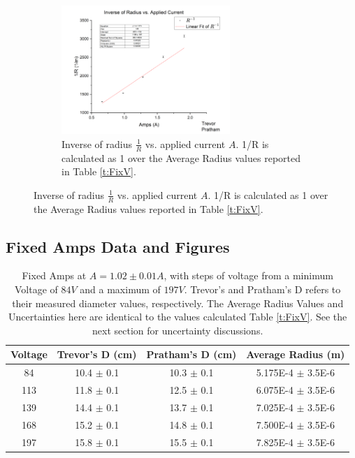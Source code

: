 \documentclass[12pt]{article}
\begin{document}
\begin{figure} [h]
    \begin{subfigure}
        \centering
        \includegraphics[width=0.7\textwidth]{figures/EOM_Fix_Voltage.png}
        \caption{Inverse of radius $\frac{1}{R}$ vs. applied current $A$. 1/R is calculated as 1 over the Average Radius values reported in Table \ref{t:FixV}.}
        \label{f:FixV}
    \end{subfigure}
\end{figure}

\clearpage

\subsection{Fixed Amps Data and Figures}

\begin{table}[h]
    \centering
    \begin{tabular}{|c|c|c|c|}
        \hline
        Voltage & Trevor's D (cm) & Pratham's D (cm) & Average Radius (m) \\ 
        \hline
        84 & 10.4 $\pm$ 0.1 & 10.3 $\pm$ 0.1 & 5.175E-4 $\pm$ 3.5E-6 \\ 
        113 & 11.8 $\pm$ 0.1 & 12.5 $\pm$ 0.1 & 6.075E-4 $\pm$ 3.5E-6 \\ 
        139 & 14.4 $\pm$ 0.1 & 13.7 $\pm$ 0.1 & 7.025E-4 $\pm$ 3.5E-6 \\ 
        168 & 15.2 $\pm$ 0.1 & 14.8 $\pm$ 0.1 & 7.500E-4 $\pm$ 3.5E-6 \\
        197 & 15.8 $\pm$ 0.1 & 15.5 $\pm$ 0.1 & 7.825E-4 $\pm$ 3.5E-6 \\
        \hline
    \end{tabular}
    \caption{Fixed Amps at $A = 1.02\pm0.01 A$, with steps of voltage from a minimum Voltage of $84V$ and a maximum of $197V$. Trevor's and Pratham's D refers to their measured diameter values, respectively. The Average Radius Values and Uncertainties here are identical to the values calculated Table \ref{t:FixV}. See the next section for uncertainty discussions.}
    \label{t:FixA}
\end{table}
\end{document}
